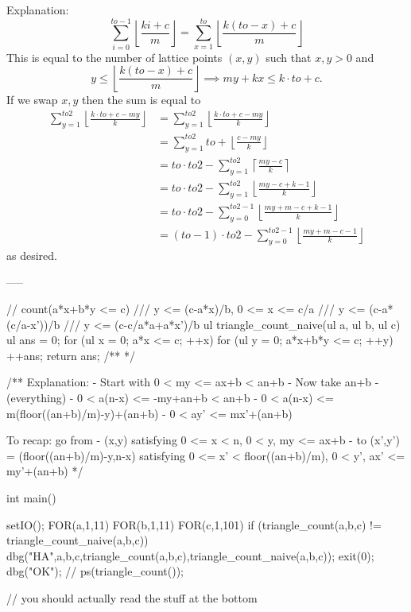 Explanation:
$$\sum_{i=0}^{to-1}\left\lfloor \frac{ki+c}{m}\right\rfloor=\sum_{x=1}^{to}\left\lfloor \frac{k(to-x)+c}{m}\right\rfloor$$
This is equal to the number of lattice points $(x,y)$ such that $x,y>0$ and
$$y\le \left\lfloor \frac{k(to-x)+c}{m}\right\rfloor\implies my+kx\le k\cdot to+c.$$
If we swap $x,y$ then the sum is equal to
\begin{align*}
\sum_{y=1}^{to2}\left\lfloor \frac{k\cdot to+c-my}{k}\right\rfloor&=\sum_{y=1}^{to2}\left\lfloor \frac{k\cdot to+c-my}{k}\right\rfloor\\
&=\sum_{y=1}^{to2}to+\left\lfloor \frac{c-my}{k}\right\rfloor\\
&=to\cdot to2-\sum_{y=1}^{to2}\left\lceil \frac{my-c}{k}\right\rceil\\
&=to\cdot to2-\sum_{y=1}^{to2}\left\lfloor \frac{my-c+k-1}{k}\right\rfloor\\
&=to\cdot to2-\sum_{y=0}^{to2-1}\left\lfloor \frac{my+m-c+k-1}{k}\right\rfloor\\
&=(to-1)\cdot to2-\sum_{y=0}^{to2-1}\left\lfloor \frac{my+m-c-1}{k}\right\rfloor
\end{align*}
as desired.

-----


// count(a*x+b*y <= c)
/// y <= (c-a*x)/b, 0 <= x <= c/a
/// y <= (c-a*(c/a-x'))/b
/// y <= (c-c/a*a+a*x')/b
ul triangle_count_naive(ul a, ul b, ul c) {
    ul ans = 0;
    for (ul x = 0; a*x <= c; ++x) 
        for (ul y = 0; a*x+b*y <= c; ++y) 
            ++ans;
    return ans;
}
/**
*/

/**
Explanation:
- Start with 0 < my <= ax+b < an+b
- Now take an+b - (everything)
- 0 < a(n-x) <= -my+an+b < an+b
- 0 < a(n-x) <= m(floor((an+b)/m)-y)+(an+b)%
- 0 < ay' <= mx'+(an+b)%

To recap: go from 
 - (x,y) satisfying 0 <= x < n, 0 < y, my <= ax+b
 - to (x',y') = (floor((an+b)/m)-y,n-x) satisfying 
   0 <= x' < floor((an+b)/m), 0 < y', ax' <= my'+(an+b)%
*/

int main() {
    setIO();
    FOR(a,1,11) FOR(b,1,11) FOR(c,1,101) {
        if (triangle_count(a,b,c) != triangle_count_naive(a,b,c)) {
            dbg("HA",a,b,c,triangle_count(a,b,c),triangle_count_naive(a,b,c));
            exit(0);
        }
    }
    dbg("OK");
    // ps(triangle_count());
    
    // you should actually read the stuff at the bottom
}